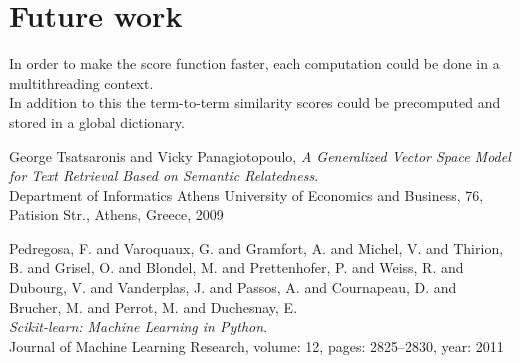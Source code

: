 \documentclass[twoside]{article}
\begin{document}
%
%

\section{Future work}
In order to make the score function faster, each computation could be done in a multithreading context.\\In addition to this the term-to-term similarity scores could be precomputed and stored in a global dictionary.
\begin{thebibliography}{999}

  George Tsatsaronis and Vicky Panagiotopoulo,
  \emph{ A Generalized Vector Space Model for Text Retrieval Based on Semantic Relatedness}.
  \\Department of Informatics Athens University of Economics and Business, 76, Patision Str., Athens, Greece,
  2009

  
  Pedregosa, F. and Varoquaux, G. and Gramfort, A. and Michel, V.
         and Thirion, B. and Grisel, O. and Blondel, M. and Prettenhofer, P.
         and Weiss, R. and Dubourg, V. and Vanderplas, J. and Passos, A. and
         Cournapeau, D. and Brucher, M. and Perrot, M. and Duchesnay, E.
  \emph{\\Scikit-learn: Machine Learning in {P}ython}.
  \\Journal of Machine Learning Research, volume: 12, pages: 2825--2830, year: 2011


\end{thebibliography}
\end{document}
